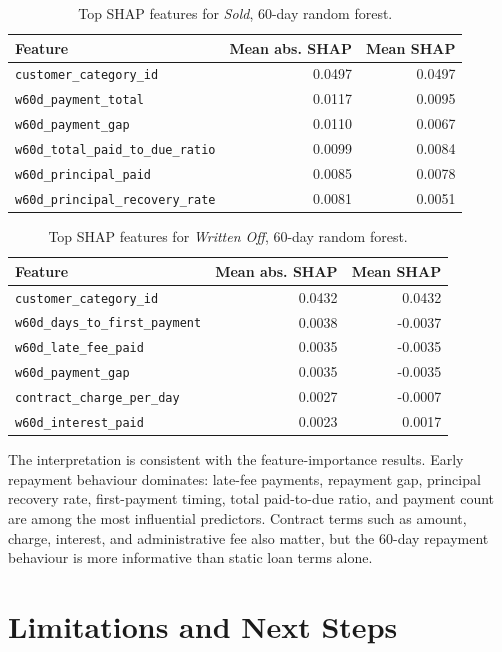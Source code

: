 \documentclass[11pt]{article}
\begin{document}
\begin{table}[h]
\centering
\caption{Top SHAP features for \textit{Sold}, 60-day random forest.}
\label{tab:shap-sold}
\begin{tabular}{lrr}
\toprule
Feature & Mean abs. SHAP & Mean SHAP \\
\midrule
\texttt{customer\_category\_id} & 0.0497 & 0.0497 \\
\texttt{w60d\_payment\_total} & 0.0117 & 0.0095 \\
\texttt{w60d\_payment\_gap} & 0.0110 & 0.0067 \\
\texttt{w60d\_total\_paid\_to\_due\_ratio} & 0.0099 & 0.0084 \\
\texttt{w60d\_principal\_paid} & 0.0085 & 0.0078 \\
\texttt{w60d\_principal\_recovery\_rate} & 0.0081 & 0.0051 \\
\bottomrule
\end{tabular}
\end{table}

\begin{table}[h]
\centering
\caption{Top SHAP features for \textit{Written Off}, 60-day random forest.}
\label{tab:shap-written-off}
\begin{tabular}{lrr}
\toprule
Feature & Mean abs. SHAP & Mean SHAP \\
\midrule
\texttt{customer\_category\_id} & 0.0432 & 0.0432 \\
\texttt{w60d\_days\_to\_first\_payment} & 0.0038 & -0.0037 \\
\texttt{w60d\_late\_fee\_paid} & 0.0035 & -0.0035 \\
\texttt{w60d\_payment\_gap} & 0.0035 & -0.0035 \\
\texttt{contract\_charge\_per\_day} & 0.0027 & -0.0007 \\
\texttt{w60d\_interest\_paid} & 0.0023 & 0.0017 \\
\bottomrule
\end{tabular}
\end{table}

The interpretation is consistent with the feature-importance results. Early repayment behaviour dominates: late-fee payments, repayment gap, principal recovery rate, first-payment timing, total paid-to-due ratio, and payment count are among the most influential predictors. Contract terms such as amount, charge, interest, and administrative fee also matter, but the 60-day repayment behaviour is more informative than static loan terms alone.

\section{Limitations and Next Steps}
\end{document}
